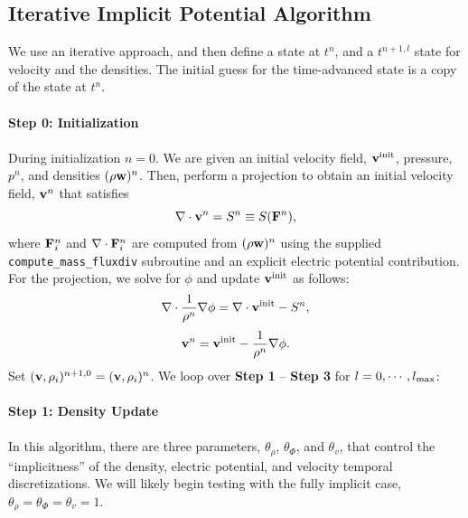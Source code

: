 \documentclass[final]{siamltex}
\def\Fb {{\bf F}}
\def\vb {{\bf v}}
\def\wb {{\bf w}}
\begin{document}
\subsection{Iterative Implicit Potential Algorithm}
We use an iterative approach, and then define a state at $t^n$, and
a $t^{n+1,l}$ state for velocity and the densities.  The initial guess for
the time-advanced state is a copy of the state at $t^n$.\\ \\
{\bf Step 0: Initialization}\\ \\
During initialization $n=0$.
We are given an initial velocity field, $\vb^{\rm init}$, pressure, $p^n$,
and densities $(\rho\wb)^n$.
Then, perform a projection to obtain an initial velocity field, $\vb^n$ that satisfies
\begin{equation}
\nabla\cdot\vb^n = S^n \equiv S(\Fb^n),
\end{equation}
where $\Fb_i^n$ and $\nabla\cdot\Fb_i^n$ are computed from $(\rho\wb)^n$ using the 
supplied {\tt compute\_mass\_fluxdiv} subroutine and an explicit electric
potential contribution.
For the projection, we solve for $\phi$ and update $\vb^{\rm init}$ as follows:
\begin{equation}
\nabla\cdot\frac{1}{\rho^n}\nabla\phi = \nabla\cdot\vb^{\rm init} - S^n,
\end{equation}
\begin{equation}
\vb^n = \vb^{\rm init} - \frac{1}{\rho^n}\nabla\phi.
\end{equation}
Set $(\vb,\rho_i)^{n+1,0} = (\vb,\rho_i)^n$.
We loop over {\bf Step 1} -- {\bf Step 3} for $l=0,\cdots,l_{\rm max}$:\\ \\
{\bf Step 1: Density Update}\\ \\
In this algorithm, there are three parameters, $\theta_\rho$, $\theta_\Phi$, 
and $\theta_v$, that control the ``implicitness'' of the density, electric potential,
and velocity temporal discretizations.
We will likely begin testing with the fully implicit case, 
$\theta_\rho=\theta_\Phi=\theta_v=1$.\\ \\
\end{document}
